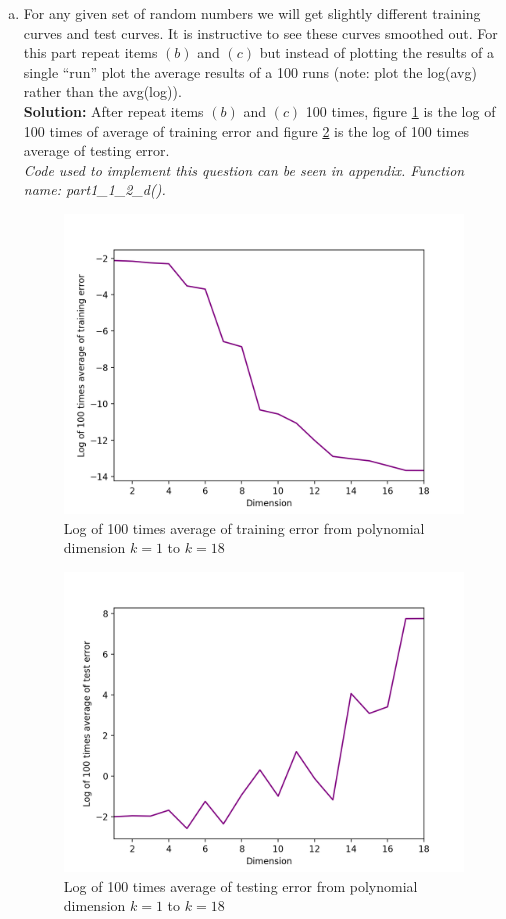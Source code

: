 \documentclass[A4,12pt]{article}
\begin{document}
\begin{enumerate}[1.]
\begin{enumerate}[(a)]
          \item For any given set of random numbers we will get slightly different training curves and test curves. It is instructive to see these curves smoothed out. For this part repeat items $(b)$ and $(c)$ but instead of plotting the results of a single “run” plot the average results of a 100 runs (note: plot the log(avg) rather than the avg(log)).\\
          \textbf{Solution:} After repeat items $(b)$ and $(c)$ 100 times, figure \ref{fig:2db} is the log of 100 times of average of training error and figure \ref{fig:2dc} is the log of 100 times average of testing error.\\
          \textit{Code used to implement this question can be seen in appendix. Function name: part1\_1\_2\_d().}
            \begin{figure}
              \centering \includegraphics[width=0.8\columnwidth]{2db}
              \caption{
                \label{fig:2db}
                Log of 100 times average of training error from polynomial dimension $k=1$ to $k=18$
              }
            \end{figure}
            \begin{figure}
              \centering \includegraphics[width=0.8\columnwidth]{2dc}
              \caption{
                \label{fig:2dc}
                Log of 100 times average of testing error from polynomial dimension $k=1$ to $k=18$
              }
            \end{figure}
        \end{enumerate}


\end{enumerate}
\end{document}
